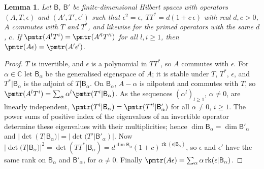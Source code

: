 \documentclass[10pt]{amsart}
\newtheorem{lemma}[theorem]{Lemma}
\theoremstyle{definition}
\theoremstyle{remark}
\newcommand{\C}{\mathbb C}
\begin{document}
\begin{lemma}\label{pm:line}
Let $\mathsf B$, $\mathsf B'$ be finite-dimensional Hilbert spaces with operators $(A,T,\epsilon)$
and $(A',T',\epsilon')$ such that $\epsilon^2=\epsilon$, $TT^*=d(1+c\,\epsilon)$ with real $d,c>0$,
$A$ commutes with $T$ and $T^*$, and likewise for the primed operators with the same $d$, $c$. If
$\pmtr(A^lT^i)=\pmtr(A'^lT'^i)$ for all $l,i\ge1$, then $\pmtr(A\epsilon)=\pmtr(A'\epsilon')$.
\end{lemma}
\begin{proof}
$T$ is invertible, and $\epsilon$ is a polynomial in $TT^*$, so $A$ commutes with $\epsilon$. For
$\alpha\in\C$ let $\mathsf B_\alpha$ be the generalised eigenspace of $A$; it is stable under $T$,
$T^*$, $\epsilon$, and $T^*|\mathsf B_\alpha$ is the adjoint of $T|\mathsf B_\alpha$. On
$\mathsf B_\alpha$, $A-\alpha$ is nilpotent and commutes with $T$, so $\pmtr(A^lT^i)=\sum_\alpha
\alpha^l\pmtr(T^i|\mathsf B_\alpha)$. As the sequences $(\alpha^l)_{l\ge1}$, $\alpha\ne0$, are
linearly independent, $\pmtr(T^i|\mathsf B_\alpha)=\pmtr(T'^i|\mathsf B'_\alpha)$ for all
$\alpha\ne0$, $i\ge1$. The power sums of positive index of the eigenvalues of an invertible
operator determine these eigenvalues with their multiplicities; hence
$\dim\mathsf B_\alpha=\dim\mathsf B'_\alpha$ and $|\det(T|\mathsf B_\alpha)|=|\det(T'|\mathsf B'_
\alpha)|$. Now $|\det(T|\mathsf B_\alpha)|^2=\det(TT^*|\mathsf B_\alpha)=d^{\dim\mathsf B_\alpha}
(1+c)^{\operatorname{rk}(\epsilon|\mathsf B_\alpha)}$, so $\epsilon$ and $\epsilon'$ have the same
rank on $\mathsf B_\alpha$ and $\mathsf B'_\alpha$, for $\alpha\ne0$. Finally
$\pmtr(A\epsilon)=\sum_\alpha\alpha\operatorname{rk}(\epsilon|\mathsf B_\alpha)$.
\end{proof}
\end{document}
